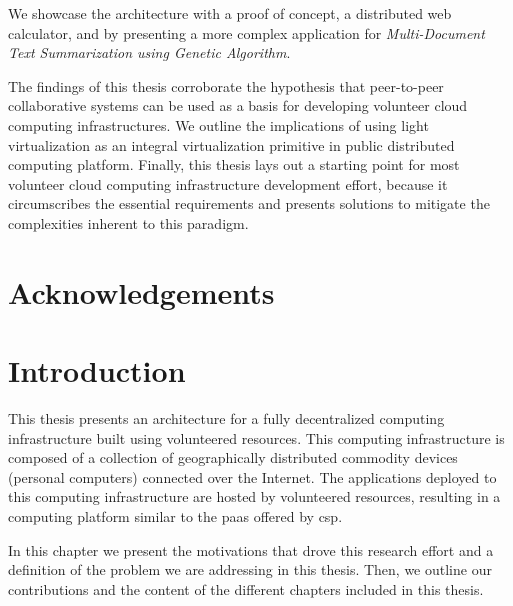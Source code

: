 \documentclass[12pt, titlepage]{uo_temp}
\begin{document}
We showcase the architecture with a proof of concept, a distributed web calculator, and by
presenting a more complex application for \emph{Multi-Document Text Summarization using
  Genetic Algorithm}. 

The findings of this thesis corroborate the hypothesis that peer-to-peer collaborative
systems can be used as a basis for developing volunteer cloud computing
infrastructures. We outline the implications of using light virtualization as an integral
virtualization primitive in public distributed computing platform. Finally, this thesis
lays out a starting point for most volunteer cloud computing infrastructure development
effort, because it circumscribes the essential requirements and presents solutions to
mitigate the complexities inherent to this paradigm.



\chapter*{Acknowledgements}%
%



\makeglossaries

\tableofcontents
\clearpage

\listoffigures
\listoftables

\printglossary
\clearpage


     \chapter{Introduction}
     This thesis presents an architecture for a fully decentralized computing
     infrastructure built using volunteered resources. This computing infrastructure is
     composed of a collection of geographically distributed commodity devices (personal
     computers) connected over the Internet. The applications deployed to this computing
     infrastructure are hosted by volunteered resources, resulting in a computing platform
     similar to the \gls{paas} offered by \gls{csp}.

     In this chapter we present the motivations that drove this research effort and a
     definition of the problem we are addressing in this thesis. Then, we outline our
     contributions and the content of the different chapters included in this thesis.
\end{document}

